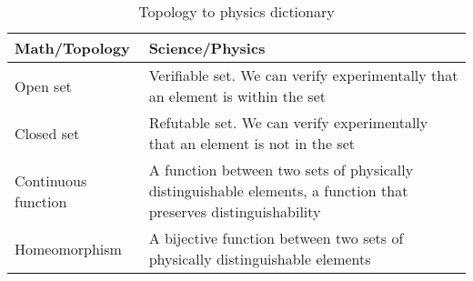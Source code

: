 \documentclass[11pt,letterpaper,fleqn]{memoir} %
\begin{document}
\begin{table}[h]
	\centering
\begin{tabular}{p{} p{}}
	Math/Topology & Science/Physics \\ 
	\hline 
	Open set & Verifiable set. We can verify experimentally that an element is within the set  \\ 
	Closed set & Refutable set. We can verify experimentally that an element is not in the set \\ 
	Continuous \newline function &  A function between two sets of physically distinguishable elements, a function that preserves distinguishability \\
	Homeomorphism &  A bijective function between two sets of physically distinguishable elements \\
\end{tabular} 
	\caption{Topology to physics dictionary}
\end{table}

	
\end{document}
